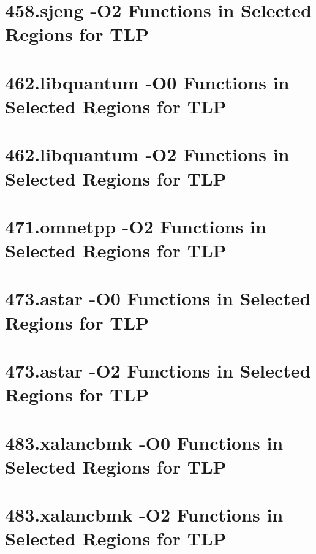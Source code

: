 \documentclass[defaultstyle,11pt]{thesis}
\begin{document}
\section{458.sjeng -O2 Functions in Selected Regions for TLP}
        {\small
          
        } 
 
\section{462.libquantum -O0 Functions in Selected Regions for TLP}
        {\small
          
        }

\section{462.libquantum -O2 Functions in Selected Regions for TLP}
        {\small
          
        }
        
\section{471.omnetpp -O2 Functions in Selected Regions for TLP}
        {\small
          
        }

\section{473.astar -O0 Functions in Selected Regions for TLP}
        {\small
          
        }

\section{473.astar -O2 Functions in Selected Regions for TLP}
        {\small
          
        }

\section{483.xalancbmk -O0 Functions in Selected Regions for TLP}
        {\small
          
        }
        
\section{483.xalancbmk -O2 Functions in Selected Regions for TLP}
        {\small
          
        }

\end{document}
